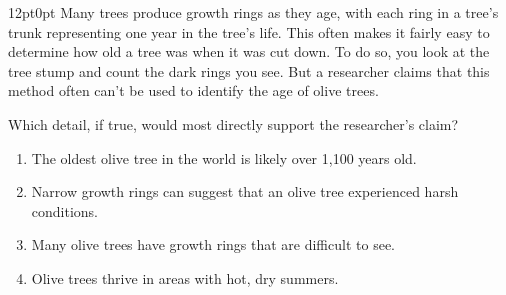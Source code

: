 \documentclass[11pt, twocolumn]{article}
\newcounter{questionnum}
\begin{document}
\vspace{6pt}\noindent
\begin{minipage}{\columnwidth}\raggedright
\noindent{}\par\vspace{8pt}
\begin{adjustwidth}{12pt}{0pt}
Many trees produce growth rings as they age, with each ring in a tree's trunk representing one year in the tree's life. This often makes it fairly easy to determine how old a tree was when it was cut down. To do so, you look at the tree stump and count the dark rings you see. But a researcher claims that this method often can't be used to identify the age of olive trees.
\vspace{6pt}

Which detail, if true, would most directly support the researcher's claim?
\begin{enumerate}[label=\Alph*),leftmargin=18pt,topsep=3pt,itemsep=2pt]
  \item The oldest olive tree in the world is likely over 1,100 years old.
  \item Narrow growth rings can suggest that an olive tree experienced harsh conditions.
  \item Many olive trees have growth rings that are difficult to see.
  \item Olive trees thrive in areas with hot, dry summers.
\end{enumerate}
\end{adjustwidth}
\end{minipage}\par
\end{document}
